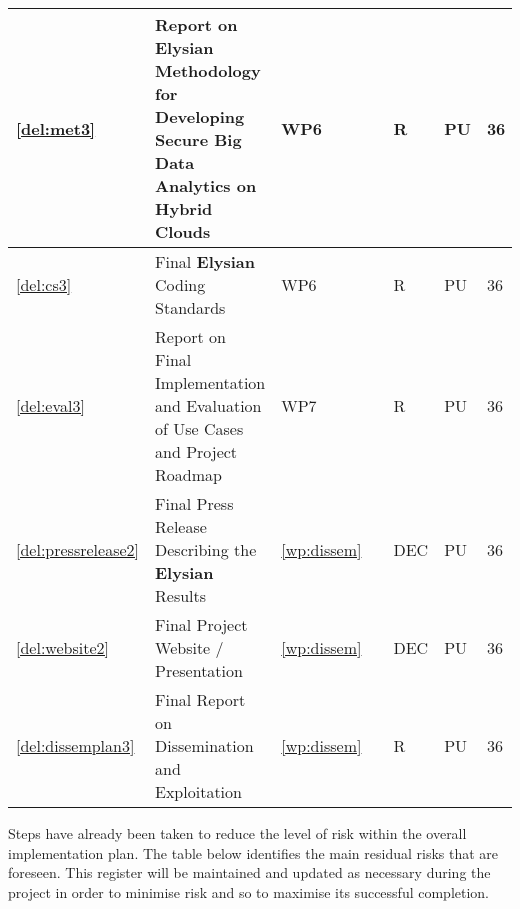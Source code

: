 \documentclass[a4paper,11pt]{article}
\newcommand{\project}[1]{\textbf{#1}\xspace}
\newcommand{\SECURITY}{\project{Elysian}}
\newcommand{\TheProject}{\SECURITY}
\begin{document}
\begin{minipage}{\textwidth}
\begin{center}
\begin{tabular}{|p{0.8cm}|p{9.65cm}|p{0.8cm}|p{1.15cm}|p{1.2cm}|p{0.8cm}|p{0.8cm}|}
\hline \ref{del:met3} & Report on \TheProject{} Methodology for Developing Secure Big Data Analytics on Hybrid Clouds & WP6 & \SAshort{} & R & PU & 36 \\
\hline \ref{del:cs3} & Final \TheProject{} Coding Standards & WP6 & \UCMshort{} & R & PU & 36 \\
\hline \ref{del:eval3} & Report on Final Implementation and Evaluation of Use Cases and Project Roadmap & WP7 & \FRQshort{} & R & PU & 36 \\
\hline \ref{del:pressrelease2} & Final Press Release Describing the \TheProject{} Results & \ref{wp:dissem} & \SAshort{} & DEC & PU & 36 \\
\hline \ref{del:website2} & Final Project Website / Presentation & \ref{wp:dissem} & \UODshort{} & DEC & PU & 36 \\
\hline \ref{del:dissemplan3} & Final Report on Dissemination and Exploitation & \ref{wp:dissem} & \UODshort{} & R & PU &  36 \\

\hline
\end{tabular}
\end{center}
\end{minipage}








\bigskip\bigskip\bigskip
\pagebreak
{}

\bigskip
Steps have already been taken to reduce the level of risk within the overall implementation plan.  The table below
identifies the main residual risks that are foreseen.  This register will be maintained
and updated as necessary during the project in order to minimise risk and so to maximise its successful completion.

\bigskip
\end{document}
